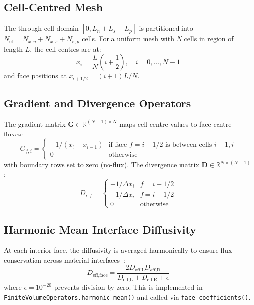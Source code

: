 \subsection{Cell-Centred Mesh}

The through-cell domain $[0, L_n + L_s + L_p]$ is partitioned into $N_\text{el} = N_{x,n} + N_{x,s} + N_{x,p}$ cells. For a uniform mesh with $N$ cells in region of length $L$, the cell centres are at:
\begin{equation}
  x_i = \frac{L}{N}\left(i + \frac{1}{2}\right), \quad i = 0,\ldots,N-1
  \label{eq:fvm_cell_centres}
\end{equation}
and face positions at $x_{i+1/2} = (i+1)L/N$.

\subsection{Gradient and Divergence Operators}

The gradient matrix $\mathbf{G} \in \mathbb{R}^{(N+1)\times N}$ maps cell-centre values to face-centre fluxes:
\begin{equation}
  G_{f,i} = \begin{cases} -1/(x_i - x_{i-1}) & \text{if face } f = i-1/2 \text{ is between cells } i-1, i \\ 0 & \text{otherwise} \end{cases}
  \label{eq:fvm_G}
\end{equation}
with boundary rows set to zero (no-flux). The divergence matrix $\mathbf{D} \in \mathbb{R}^{N \times (N+1)}$:
\begin{equation}
  D_{i,f} = \begin{cases} -1/\Delta x_i & f = i - 1/2 \\ +1/\Delta x_i & f = i + 1/2 \\ 0 & \text{otherwise} \end{cases}
  \label{eq:fvm_D}
\end{equation}

\subsection{Harmonic Mean Interface Diffusivity}

At each interior face, the diffusivity is averaged harmonically to ensure flux conservation across material interfaces~\cite{Patankar1980}:
\begin{equation}
  D_\text{eff,face} = \frac{2 D_\text{eff,L} D_\text{eff,R}}{D_\text{eff,L} + D_\text{eff,R} + \epsilon}
  \label{eq:harmonic_mean}
\end{equation}
where $\epsilon = 10^{-20}$ prevents division by zero. This is implemented in \texttt{FiniteVolumeOperators.harmonic\_mean()} and called via \texttt{face\_coefficients()}.

